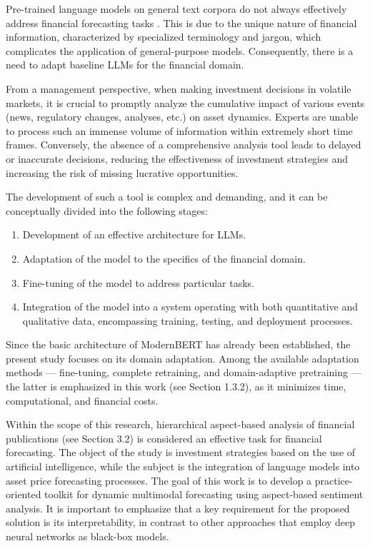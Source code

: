 Pre-trained language models on general text corpora do not always effectively address financial forecasting tasks \parencite{Jiang2023}.
This is due to the unique nature of financial information, characterized by specialized terminology and jargon, which complicates
the application of general-purpose models. Consequently, there is a need to adapt baseline LLMs for the financial domain.

From a management perspective, when making investment decisions in volatile markets, it is crucial to promptly analyze the cumulative
impact of various events (news, regulatory changes, analyses, etc.) on asset dynamics. Experts are unable to process such an immense
volume of information within extremely short time frames. Conversely, the absence of a comprehensive analysis tool leads to delayed
or inaccurate decisions, reducing the effectiveness of investment strategies and increasing the risk of missing lucrative opportunities.

The development of such a tool is complex and demanding, and it can be conceptually divided into the following stages:
\begin{enumerate}
    \item Development of an effective architecture for LLMs.
    \item Adaptation of the model to the specifics of the financial domain.
    \item Fine-tuning of the model to address particular tasks.
    \item Integration of the model into a system operating with both quantitative and qualitative data, encompassing training, testing,
    and deployment processes.
\end{enumerate}

Since the basic architecture of ModernBERT has already been established, the present study focuses on its domain adaptation.
Among the available adaptation methods --- fine-tuning, complete retraining, and domain-adaptive pretraining --- the latter is emphasized
in this work (see Section 1.3.2), as it minimizes time, computational, and financial costs.

Within the scope of this research, hierarchical aspect-based analysis of financial publications (see Section 3.2) is considered
an effective task for financial forecasting. The object of the study is investment strategies based on the use of artificial intelligence,
while the subject is the integration of language models into asset price forecasting processes. The goal of this work is to develop
a practice-oriented toolkit for dynamic multimodal forecasting using aspect-based sentiment analysis. It is important to emphasize
that a key requirement for the proposed solution is its interpretability, in contrast to other approaches that employ deep neural
networks as black-box models.

